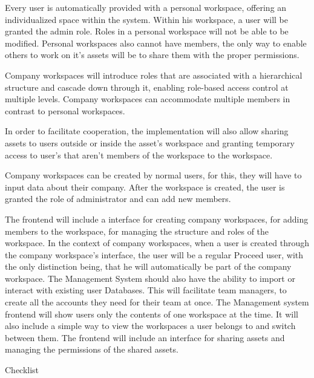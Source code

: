 Every user is automatically provided with a personal workspace, offering an individualized space within the system.
Within his workspace, a user will be granted the admin role.
Roles in a personal workspace will not be able to be modified.
Personal workspaces also cannot have members, the only way to enable others to work on it's assets will be to share them with the proper permissions.

Company workspaces will introduce roles that are associated with a hierarchical structure and cascade down through it, enabling role-based access control at multiple levels.
Company workspaces can accommodate multiple members in contrast to personal workspaces.

In order to facilitate cooperation, 
the implementation will also allow sharing assets to users outside or inside the asset's workspace and granting temporary access to user's that aren't members of the workspace to the workspace.

Company workspaces can be created by normal users, for this, they will have to input data about their company. After the workspace is created, the user is granted the role of administrator and can add new members.

The frontend will include a interface for creating company workspaces, for adding members to the workspace, for managing the structure and roles of the workspace.
In the context of company workspaces, when a user is created through the company workspace's interface, the user will be a regular Proceed user, with the only distinction being, that he will automatically be part of the company workspace.
The Management System should also have the ability to import or interact with existing user Databases.
This will facilitate team managers, to create all the accounts they need for their team at once.
The Management system frontend will show users only the contents of one workspace at the time. It will also include a simple way to view the workspaces a user belongs to and switch between them.
The frontend will include an interface for sharing assets and managing the permissions of the shared assets.

Checklist


